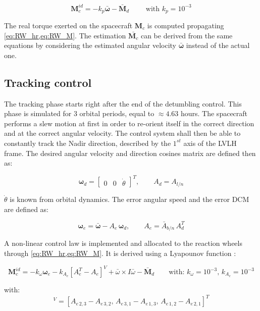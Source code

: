 \begin{equation}
    \mathbf{M}_c^{id} = - k_p \bar{\bm{\omega}} - \bar{\mathbf{M}}_d \qquad \text{ with } k_p = 10^{-3}
\end{equation}

The real torque exerted on the spacecraft $\mathbf{M}_c$ is computed propagating \cref{eq:RW_hr,eq:RW_M}. The estimation $\bar{\mathbf{M}_c}$ can be derived from the same equations by considering the estimated angular velocity $\bar{\bm{\omega}}$ instead of the actual one.

\subsection{Tracking control}

The tracking phase starts right after the end of the detumbling control. This phase is simulated for 3 orbital periods, equal to $\approx 4.63$ hours. The spacecraft performs a slew motion at first in order to re-orient itself in the correct direction and at the correct angular velocity. The control system shall then be able to constantly track the Nadir direction, described by the $1^{st}$ axis of the LVLH frame. The desired angular velocity and direction cosines matrix are defined then as:

\begin{equation}
    \bm{\omega}_d = \begin{bmatrix}
    0 & 0 & \dot{\theta}
    \end{bmatrix}^T, \qquad
    A_d = A_{l/n}
\end{equation}

$\dot{\theta}$ is known from orbital dynamics. The error angular speed and the error DCM are defined as:

\begin{equation}
    \bm{\omega}_e = \bar{\bm{\omega}} - A_e\,\bm{\omega}_d , \qquad A_e = \bar{A}_{b/n}\,A_d^T
\end{equation}

A non-linear control law is implemented and allocated to the reaction wheels through \cref{eq:RW_hr,eq:RW_M}. It is derived using a Lyapounov function \cite{biggs}:

\begin{equation}
    \mathbf{M}_c^{id} = - k_{\omega} \bm{\omega}_e - k_{A_e}[A_e^T - A_e]^V + \bar{\omega} \times I \bar{\omega} - \bar{\mathbf{M}}_d \qquad \text{with: } k_{\omega} = 10^{-3}, \, k_{A_e} = 10^{-3}
\end{equation}

with:
\begin{equation}
    [A_e^T - A_e]^V = [A_{e\,2,3} - A_{e\,3,2}, \, A_{e\,3,1} - A_{e\,1,3}, \, A_{e\,1,2} - A_{e\,2,1}]^T
\end{equation}